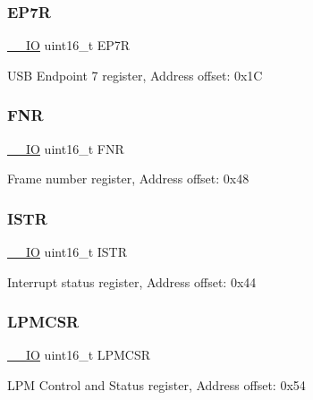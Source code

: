 \subsubsection{\texorpdfstring{E\+P7R}{EP7R}}
{\footnotesize\ttfamily \hyperlink{core__sc300_8h_aec43007d9998a0a0e01faede4133d6be}{\+\_\+\+\_\+\+IO} uint16\+\_\+t E\+P7R}

U\+SB Endpoint 7 register, Address offset\+: 0x1C \mbox{\label{struct_u_s_b___type_def_a5ecb1ade997ff76fd2ff76370717d464}} 
\subsubsection{\texorpdfstring{F\+NR}{FNR}}
{\footnotesize\ttfamily \hyperlink{core__sc300_8h_aec43007d9998a0a0e01faede4133d6be}{\+\_\+\+\_\+\+IO} uint16\+\_\+t F\+NR}

Frame number register, Address offset\+: 0x48 \mbox{\label{struct_u_s_b___type_def_a54fc7329a9549448d56b50bcca73bab4}} 
\subsubsection{\texorpdfstring{I\+S\+TR}{ISTR}}
{\footnotesize\ttfamily \hyperlink{core__sc300_8h_aec43007d9998a0a0e01faede4133d6be}{\+\_\+\+\_\+\+IO} uint16\+\_\+t I\+S\+TR}

Interrupt status register, Address offset\+: 0x44 \mbox{\label{struct_u_s_b___type_def_ae21a63f0e47e2b526ec7087deca91d96}} 
\subsubsection{\texorpdfstring{L\+P\+M\+C\+SR}{LPMCSR}}
{\footnotesize\ttfamily \hyperlink{core__sc300_8h_aec43007d9998a0a0e01faede4133d6be}{\+\_\+\+\_\+\+IO} uint16\+\_\+t L\+P\+M\+C\+SR}

L\+PM Control and Status register, Address offset\+: 0x54 \mbox{\label{struct_u_s_b___type_def_ab234cb4952ccf50c24a841b3f2f28a91}} 
